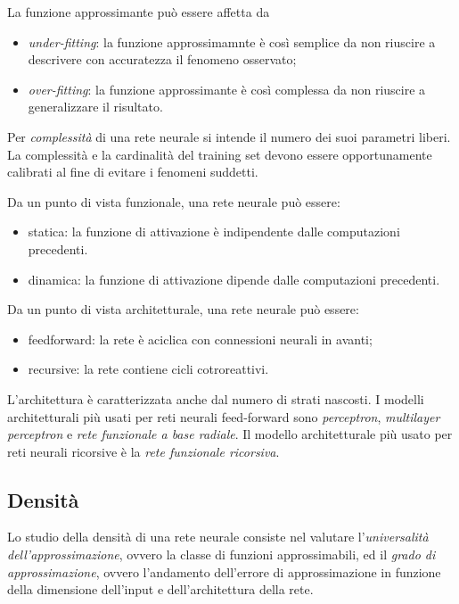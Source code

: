 La funzione approssimante può essere affetta da
\begin{itemize}
  \item \textit{under-fitting}: la funzione approssimamnte è così semplice da non riuscire a descrivere con accuratezza il fenomeno osservato;
  \item \textit{over-fitting}: la funzione approssimante è così complessa da non riuscire a generalizzare il risultato.
\end{itemize}

Per \textit{complessità} di una rete neurale si intende il numero dei suoi parametri liberi. La complessità e la cardinalità del training set devono essere opportunamente calibrati al fine di evitare i fenomeni suddetti.

Da un punto di vista funzionale, una rete neurale può essere:
\begin{itemize}
  \item statica: la funzione di attivazione è indipendente dalle computazioni precedenti.
  \item dinamica: la funzione di attivazione dipende dalle computazioni precedenti.
\end{itemize}

Da un punto di vista architetturale, una rete neurale può essere:
\begin{itemize}
  \item feedforward: la rete è aciclica con connessioni neurali in avanti;
  \item recursive: la rete contiene cicli cotroreattivi.
\end{itemize}

L'architettura è caratterizzata anche dal numero di strati nascosti.
I modelli architetturali più usati per reti neurali feed-forward sono \textit{perceptron}, \textit{multilayer perceptron} e \textit{rete funzionale a base radiale}.
Il modello architetturale più usato per reti neurali ricorsive è la \textit{rete funzionale ricorsiva}.


\subsection{Densità}
\label{sec:neural-networks.density}
Lo studio della densità di una rete neurale consiste nel valutare l'\textit{universalità dell'approssimazione}, ovvero la classe di funzioni approssimabili, ed il \textit{grado di approssimazione}, ovvero l'andamento dell'errore di approssimazione in funzione della dimensione dell'input e dell'architettura della rete.


